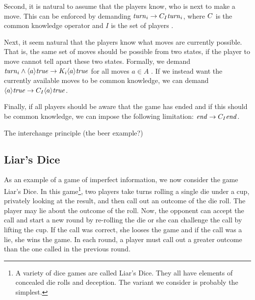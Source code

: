 Second, it is natural to assume that the players know, who is next to make a move. This can be enforced by demanding $ \mathit{turn}_{i} \rightarrow C_{I} \mathit{turn}_{i} $, where $ C $ is the common knowledge operator and $ I $ is the set of players \cite{benthem2001a}.

Next, it seem natural that the players know what moves are currently possible. That is, the same set of moves should be possible from two states, if the player to move cannot tell apart these two states. Formally, we demand $ \mathit{turn}_{i} \wedge \langle a \rangle \mathit{true} \rightarrow K_{i} \langle a \rangle \mathit{true} $ for all moves $ a \in A $ \cite{benthem2001a}. If we instead want the currently available moves to be common knowledge, we can demand $ \langle a \rangle \mathit{true} \rightarrow C_{I} \langle a \rangle \mathit{true} $.

Finally, if all players should be aware that the game has ended and if this should be common knowledge, we can impose the following limitation: $ \mathit{end} \rightarrow C_{I} \mathit{end} $.

{ \color{red} The interchange principle (the beer example?)}



\subsection{Liar's Dice} \label{sec:liars-dice}

As an example of a game of imperfect information, we now consider the game Liar's Dice. In this game\footnote{A variety of dice games are called Liar's Dice. They all have elements of concealed die rolls and deception. The variant we consider is probably the simplest.}, two players take turns rolling a single die under a cup, privately looking at the result, and then call out an outcome of the die roll. The player may lie about the outcome of the roll. Now, the opponent can accept the call and start a new round by re-rolling the die or she can challenge the call by lifting the cup. If the call was correct, she looses the game and if the call was a lie, she wins the game. In each round, a player must call out a greater outcome than the one called in the previous round.

